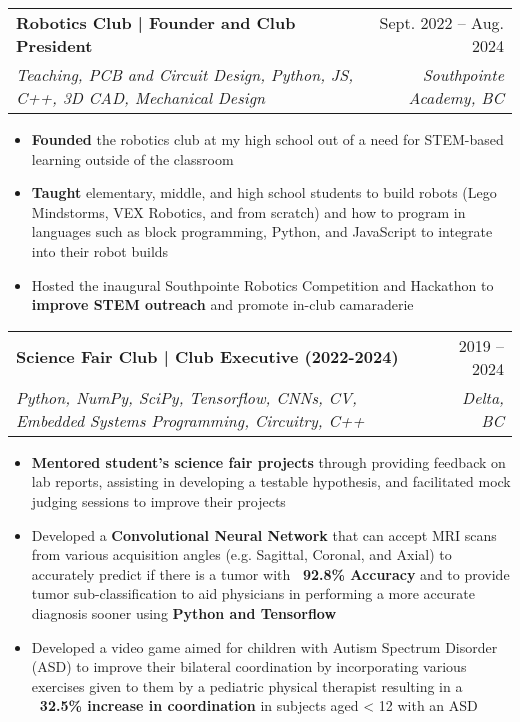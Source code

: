 \documentclass[letterpaper,11pt]{article}
\makeatletter
\newcommand{\resumeItem}[1]{
  \item\small{
    {#1 \vspace{-2pt}}
  }
}
\newcommand{\resumeSubheading}[4]{
  \vspace{-2pt}\item
    \begin{tabular*}{0.97\textwidth}[t]{l@{\extracolsep{\fill}}r}
      \textbf{#1} & #2 \\
      \textit{\small#3} & \textit{\small #4} \\
    \end{tabular*}\vspace{-7pt}
}
\newcommand{\resumeProjectHeading}[2]{
    \item
    \begin{tabular*}{0.97\textwidth}{l@{\extracolsep{\fill}}r}
      \small#1 & #2 \\
    \end{tabular*}\vspace{-7pt}
}
\newcommand{\resumeSubHeadingListStart}{\begin{itemize}[leftmargin=0.15in, label={}]}
\newcommand{\resumeSubHeadingListEnd}{\end{itemize}}
\newcommand{\resumeItemListStart}{\begin{itemize}}
\newcommand{\resumeItemListEnd}{\end{itemize}\vspace{-5pt}}
\makeatother
\begin{document}
    \resumeSubheading
      {Robotics Club | Founder and Club President}{Sept. 2022 -- Aug. 2024}
      {Teaching, PCB and Circuit Design, Python, JS, C++, 3D CAD, Mechanical Design}{Southpointe Academy, BC}
      \resumeItemListStart
        \resumeItem{\textbf{Founded} the robotics club at my high school out of a need for STEM-based learning outside of the classroom}
        \resumeItem{\textbf{Taught} elementary, middle, and high school students to build robots (Lego Mindstorms, VEX Robotics, and from scratch) and how to program in languages such as block programming, Python, and JavaScript to integrate into their robot builds}
        \resumeItem{Hosted the inaugural Southpointe Robotics Competition and Hackathon to \textbf{improve STEM outreach} and promote in-club camaraderie}
      \resumeItemListEnd
    \resumeSubheading
      {Science Fair Club | Club Executive (2022-2024)}{2019 -- 2024}
      {Python, NumPy, SciPy, Tensorflow, CNNs, CV, Embedded Systems Programming, Circuitry, C++}{Delta, BC}
      \resumeItemListStart
        \resumeItem{\textbf{Mentored student’s science fair projects} through providing feedback on lab reports, assisting in developing a testable hypothesis, and facilitated mock judging sessions to improve their projects}
        \resumeItem{Developed a \textbf{Convolutional Neural Network} that can accept MRI scans from various acquisition angles (e.g. Sagittal, Coronal, and Axial) to accurately predict if there is a tumor with \textbf{~92.8\% Accuracy} and to provide tumor sub-classification to aid physicians in performing a more accurate diagnosis sooner using \textbf{Python and Tensorflow}}
        \resumeItem{Developed a video game aimed for children with Autism Spectrum Disorder (ASD) to improve their bilateral coordination by incorporating various exercises given to them by a pediatric physical therapist resulting in a \textbf{~32.5\% increase in coordination} in subjects aged < 12 with an ASD}
    \resumeItemListEnd

\begin{comment}

\section{Projects}
    \resumeSubHeadingListStart
      \resumeProjectHeading
          {\textbf{Gitlytics}}{June 2020 -- Present}
          \resumeItemListStart
            \resumeItem{Developed a}
            \resumeItem{Implemented GitHub OAuth to get data from user’s repositories}
            \resumeItem{Visualized GitHub data to show collaboration}
            \resumeItem{Used Celery and Redis for asynchronous tasks}
          \resumeItemListEnd
    \resumeSubHeadingListEnd

\end{comment}
\end{document}

